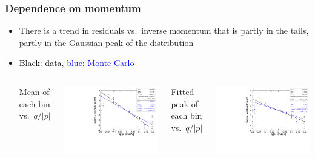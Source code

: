 \documentclass[compress]{beamer}
\begin{document}
\begin{frame}
\frametitle{Dependence on momentum}
\begin{itemize}
\item There is a trend in residuals vs.\ inverse momentum that is
  partly in the tails, partly in the Gaussian peak of the distribution
\item \textcolor{black}{Black: data}, \textcolor{blue}{blue: Monte Carlo}

\begin{columns}
\begin{center}
Mean of each bin vs.\ $q/|p|$
\end{center}
\includegraphics[width=\linewidth]{nocuts_means.pdf}

\begin{center}
Fitted peak of each bin vs.\ $q/|p|$
\end{center}
\includegraphics[width=\linewidth]{nocuts_gausspeak.pdf}
\end{columns}
\end{itemize}
\end{frame}
\end{document}
